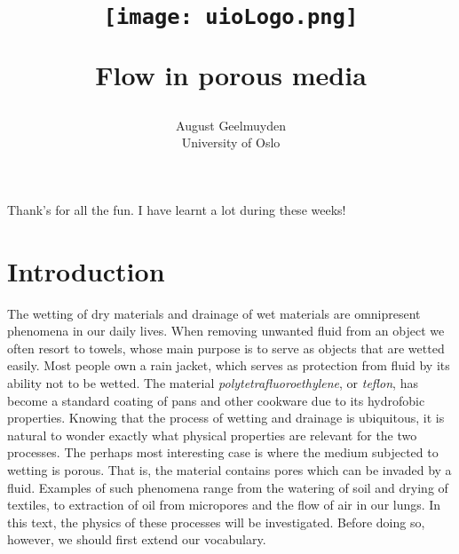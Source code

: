 \documentclass[twoside,utf8]{article}
\title{
\begin{center}
\texttt{[image: uioLogo.png]}
\end{center}
\fontsize{22pt}{10pt}\selectfont Flow in porous media } %
\author{
\large
August Geelmuyden
\\[2mm] %
\normalsize
University of Oslo \\ %
}
\date{}
\begin{document}
\maketitle %
\begin{center}
	Thank's for all the fun. I have learnt a lot during these weeks!
\end{center}
\tableofcontents
\newpage
\nocentering




\section{Introduction}
\begin{comment}
Place the research in a broader picture.\\
Give overview of earlier relevant studies. \\
Why this work is important. \\
\end{comment}
\noindent
The wetting of dry materials and drainage of wet materials are omnipresent phenomena in our daily lives.
When removing unwanted fluid from an object we often resort to towels, whose main purpose is to serve as objects that are wetted easily.
Most people own a rain jacket, which serves as protection from fluid by its ability not to be wetted. The material {\it polytetrafluoroethylene}, or {\it teflon}, has become a standard coating of pans and other cookware due to its hydrofobic properties.
Knowing that the process of wetting and drainage is ubiquitous, it is natural to wonder exactly what physical properties
are relevant for the two processes. The perhaps most interesting case is where the medium subjected to wetting is porous. That is, the material contains pores which can be invaded by a fluid. Examples of such phenomena range from the watering of soil and drying of textiles, to extraction of oil from micropores and the flow of air in our lungs. In this text, the physics of these processes will be investigated. Before doing so, however, we should first extend our vocabulary.
\end{document}

